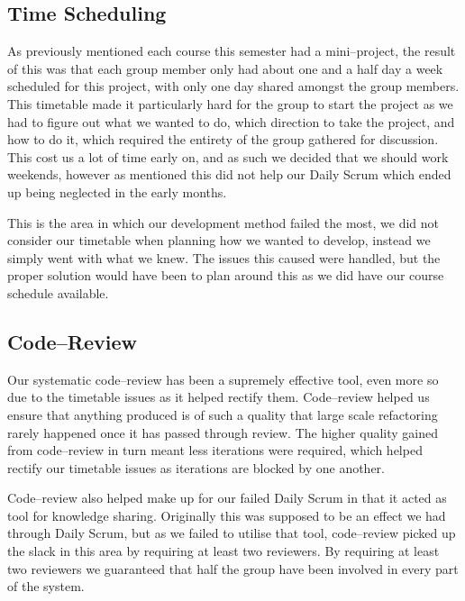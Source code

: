 \subsection{Time Scheduling}\label{sub:time_scheduling}
As previously mentioned each course this semester had a mini--project, the result of this was that each group member only had about one and a half day a week scheduled for this project, with only one day shared amongst the group members.
This timetable made it particularly hard for the group to start the project as we had to figure out what we wanted to do, which direction to take the project, and how to do it, which required the entirety of the group gathered for discussion.
This cost us a lot of time early on, and as such we decided that we should work weekends, however as mentioned this did not help our Daily Scrum which ended up being neglected in the early months.

This is the area in which our development method failed the most, we did not consider our timetable when planning how we wanted to develop, instead we simply went with what we knew.
The issues this caused were handled, but the proper solution would have been to plan around this as we did have our course schedule available.

\subsection{Code--Review}
Our systematic code--review has been a supremely effective tool, even more so due to the timetable issues as it helped rectify them.
Code--review helped us ensure that anything produced is of such a quality that large scale refactoring rarely happened once it has passed through review.
The higher quality gained from code--review in turn meant less iterations were required, which helped rectify our timetable issues as iterations are blocked by one another.

Code--review also helped make up for our failed Daily Scrum in that it acted as tool for knowledge sharing.
Originally this was supposed to be an effect we had through Daily Scrum, but as we failed to utilise that tool, code--review picked up the slack in this area by requiring at least two reviewers.
By requiring at least two reviewers we guaranteed that half the group have been involved in every part of the system.

